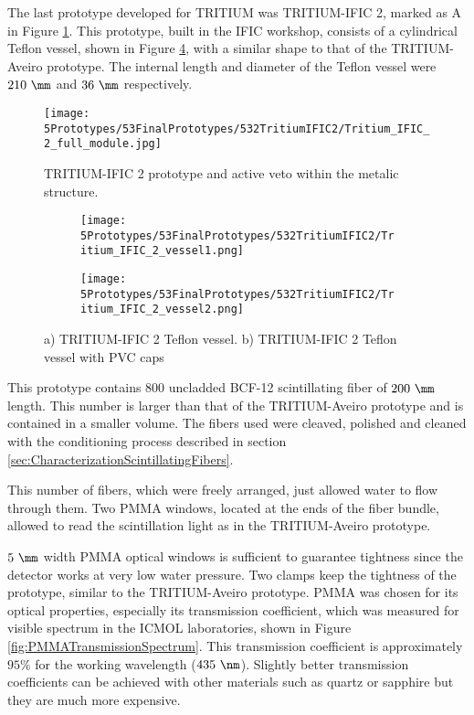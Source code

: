 The last prototype developed for TRITIUM was TRITIUM-IFIC 2, marked as A in Figure \ref{fig:TritiumIFIC2}. This prototype, built in the IFIC workshop, consists of a cylindrical Teflon vessel, shown in Figure \ref{fig:Tritium-IFIC2_vessels}, with a similar shape to that of the TRITIUM-Aveiro prototype. The internal length and diameter of the Teflon vessel were $210~\mm$ and $36~\mm$ respectively.

\begin{figure}[h]
\centering
\texttt{[image: 5Prototypes/53FinalPrototypes/532TritiumIFIC2/Tritium\_IFIC\_2\_full\_module.jpg]}
\caption{TRITIUM-IFIC 2 prototype and active veto within the metalic structure.\label{fig:TritiumIFIC2}}
\end{figure}

\begin{figure}
\centering
    \begin{subfigure}[b]{0.35\textwidth}
    \centering
    \texttt{[image: 5Prototypes/53FinalPrototypes/532TritiumIFIC2/Tritium\_IFIC\_2\_vessel1.png]}  
    \caption{\label{subfig:Tritium_IFIC_2_vessel}}
    \end{subfigure}
    \hfill
    \begin{subfigure}[b]{0.3\textwidth}
    \centering
    \texttt{[image: 5Prototypes/53FinalPrototypes/532TritiumIFIC2/Tritium\_IFIC\_2\_vessel2.png]}  
    \caption{\label{subfig:TritiumIFIC2_vessel_with_PVC_caps}}
    \end{subfigure}
 \caption{a) TRITIUM-IFIC 2 Teflon vessel. b) TRITIUM-IFIC 2 Teflon vessel with PVC caps}
 \label{fig:Tritium-IFIC2_vessels}
\end{figure}

This prototype contains $800$ uncladded BCF-12 scintillating fiber of $200~\mm$ length. This number is larger than that of the TRITIUM-Aveiro prototype and is contained in a smaller volume. The fibers used were cleaved, polished and cleaned with the conditioning process described in section \ref{sec:CharacterizationScintillatingFibers}.

This number of fibers, which were freely arranged, just allowed water to flow through them. Two PMMA windows, located at the ends of the fiber bundle, allowed to read the scintillation light as in the TRITIUM-Aveiro prototype. 

$5~\mm$ width PMMA optical windows is sufficient to guarantee tightness since the detector works at very low water pressure. Two clamps keep the tightness of the prototype, similar to the TRITIUM-Aveiro prototype. PMMA was chosen for its optical properties, especially its transmission coefficient, which was measured for visible spectrum in the ICMOL laboratories, shown in Figure \ref{fig:PMMATransmissionSpectrum}. This transmission coefficient is approximately $95\%$ for the working wavelength ($435~\nm$). Slightly better transmission coefficients can be achieved with other materials such as quartz or sapphire but they are much more expensive.

